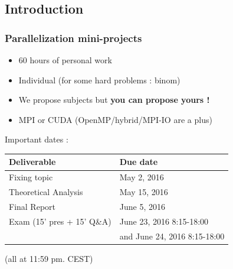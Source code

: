 \subsection{Introduction}
\begin{frame}[containsverbatim]
\frametitle{Parallelization mini-projects}

\begin{itemize}
	\item{60 hours of personal work}
	\item{Individual (for some hard problems : binom)}
	\item{We propose subjects but \textbf{you can propose yours !}}
	\item{MPI or CUDA (OpenMP/hybrid/MPI-IO are a plus)}
\end{itemize}


Important dates :

\begin{center}
\begin{tabular}{ | l | l |}
\hline
\textbf{Deliverable} & \textbf{Due date} \\
\hline
Fixing topic & May 2, 2016 \\
\hline
Theoretical Analysis & May 15, 2016 \\
\hline
Final Report & June 5, 2016 \\
\hline
Exam (15' pres + 15' Q\&A) & June 23, 2016 8:15-18:00 \\
&and June 24, 2016 8:15-18:00 \\
\hline
\end{tabular}	
\end{center}

(all at 11:59 pm. CEST)

\end{frame}




